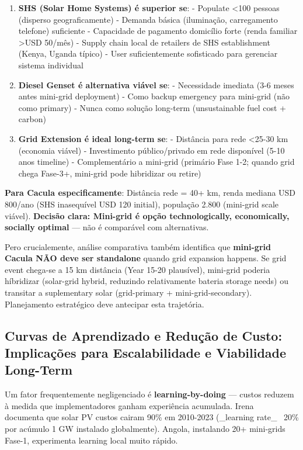\documentclass[12pt, a4paper]{article}
\begin{document}
{{{{{{{{{{{{\begin{enumerate}
\item \textbf{SHS (Solar Home Systems) é superior se}:
   - Populate <100 pessoas (disperso geograficamente)
   - Demanda básica (iluminação, carregamento telefone) suficiente
   - Capacidade de pagamento domicílio forte (renda familiar >USD 50/mês)
   - Supply chain local de retailers de SHS establishment (Kenya, Uganda típico)
   - User suficientemente sofisticado para gerenciar sistema individual

\item \textbf{Diesel Genset é alternativa viável se}:
   - Necessidade imediata (3-6 meses antes mini-grid deployment)
   - Como backup emergency para mini-grid (não como primary)
   - Nunca como solução long-term (unsustainable fuel cost + carbon)

\item \textbf{Grid Extension é ideal long-term se}:
   - Distância para rede <25-30 km (economia viável)
   - Investimento público/privado em rede disponível (5-10 anos timeline)
   - Complementário a mini-grid (primário Fase 1-2; quando grid chega Fase-3+, mini-grid pode hibridizar ou retire)

\end{enumerate}

\textbf{Para Cacula especificamente}: Distância rede = 40+ km, renda mediana USD 800/ano (SHS inasequível USD 120 initial), população 2.800 (mini-grid scale viável). \textbf{Decisão clara: Mini-grid é opção technologically, economically, socially optimal} — não é comparável com alternativas.

Pero crucialemente, análise comparativa também identifica que \textbf{mini-grid Cacula NÃO deve ser standalone} quando grid expansion happens. Se grid event chega-se a 15 km distância (Year 15-20 plausível), mini-grid poderia híbridizar (solar-grid hybrid, reduzindo relativamente bateria storage needs) ou transitar a suplementary solar (grid-primary + mini-grid-secondary). Planejamento estratégico deve antecipar esta trajetória.

\subsection{Curvas de Aprendizado e Redução de Custo: Implicações para Escalabilidade e Viabilidade Long-Term}

Um fator frequentemente negligenciado é \textbf{learning-by-doing} — custos reduzem à medida que implementadores ganham experiência acumulada. Irena~\citep{IRENA2023a} documenta que solar PV custos cairam 90\% em 2010-2023 (_learning rate_ ~20\% por acúmulo 1 GW instalado globalmente). Angola, instalando 20+ mini-grids Fase-1, experimenta learning local muito rápido.

}}}}}}}}}}}}
\end{document}
